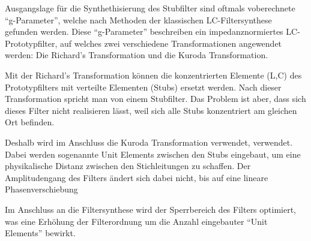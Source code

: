 Ausgangslage  für  die  Synthethisierung  des  Stubfilter  sind oftmals voberechnete
``g-Parameter'',  welche  nach  Methoden  der   klassischen  LC-Filtersynthese
gefunden  werden.  Diese  ``g-Parameter'' beschreiben  ein  impedanznormiertes
LC-Prototypfilter, auf    welches    zwei    verschiedene   Transformationen
angewendet werden: Die Richard's Transformation und die Kuroda Transformation.

Mit der Richard's Transformation können  die konzentrierten Elemente (L,C) des
Prototypfilters mit verteilte  Elementen  (Stubs)  ersetzt werden. Nach dieser
Transformation  spricht  man  von einem Stubfilter. Das Problem ist aber, dass
sich dieses Filter nicht realisieren lässt,  weil sich alle Stubs konzentriert
am gleichen Ort befinden.

Deshalb  wird  im  Anschluss  die Kuroda Transformation verwendet,  verwendet.
Dabei  werden sogenannte Unit Elements zwischen den Stubs eingebaut,  um  eine
physikalische   Distanz  zwischen  den   Stichleitungen   zu   schaffen.   Der
Amplitudengang  des  Filters ändert sich dabei nicht,  bis  auf  eine  lineare
Phasenverschiebung

Im  Anschluss  an   die  Filtersynthese  wird  der  Sperrbereich  des  Filters
optimiert,  was  eine  Erhöhung  der Filterordnung um die  Anzahl  eingebauter
``Unit  Elements'' bewirkt.






